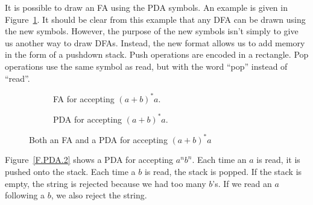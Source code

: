 \documentclass[letterpaper,12pt,openany,reqno]{book}%
\newcommand{\fanonterminalnode}[2] {\node at (#1) (#2) [circle, draw, minimum size=24pt] {#2};}
\newcommand{\faarctransition}[5] {\draw [->] (#1) to[out=#4, in=#5] node  [midway, above] {#3} (#2) ;}
\newcommand{\faloopright}[2] {\draw (#1) edge [loop right] node {#2} ();}
\newcommand{\faloopleft}[2] {\path (#1) edge [loop left] node {#2} ();}
\newcommand{\pdaterminal}[3] {\node at (#1) (#2) [rectangle, draw, rounded corners] {#3};}
\newcommand{\pdaread}[3] {\node at (#1) (#2) [diamond, draw] {#3}; }
\newcommand{\pdatransition}[3] {\draw [->] (#1) -- (#2) node [midway, above] {#3};}
\newcommand{\pdaxthree}[4] {\draw [->] (#1) -- (#2) node [midway, above] {#4} -- (#3) ;}
\newcommand{\pdaxfour}[5] {\draw [->] (#1) -- (#2) node [midway, above] {#5} -- (#3) -- (#4);}
\newcommand{\pdarighttransition}[3] {\draw [->] (#1) -- (#2) node [midway, right] {#3};}
\begin{document}
It is possible to draw an FA using the PDA symbols. An example is given in Figure~\ref{F.PDA.1}. It should be clear from this example that any DFA can be drawn using the new symbols. However, the purpose of the new symbols isn't simply to give us another way to draw DFAs. Instead, the new format allows us to add memory in the form of a pushdown stack. Push operations are encoded in a rectangle. Pop operations use the same symbol as read, but with the word ``pop'' instead of ``read''.
\begin{figure}[htbp]
\centering
\begin{subfigure}[b]{0.45\textwidth}
\centering
{}
 \caption{FA for accepting $(a+b)^*a$.}
\end{subfigure}

\begin{subfigure}[b]{0.45\textwidth}
\centering
{}
 \caption{PDA for accepting $(a+b)^*a$.}
\end{subfigure}

\caption{Both an FA and a PDA for accepting $(a+b)^*a$}
\label{F.PDA.1}
\end{figure}

Figure~\ref{F.PDA.2} shows a PDA for accepting $a^nb^n$. Each time an $a$ is read, it is pushed onto the stack. Each time a $b$ is read, the stack is popped. If the stack is empty, the string is rejected because we had too many $b$'s. If we read an $a$ following a $b$, we also reject the string.
\end{document}
